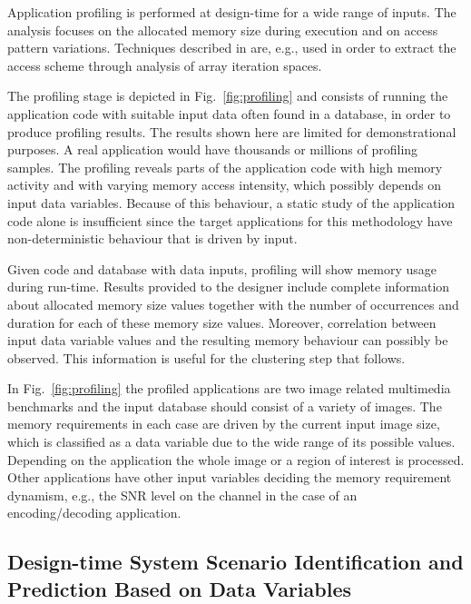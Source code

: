 \documentclass[a4paper,conference]{IEEEtran}
\begin{document}
Application profiling is performed at design-time for a wide range of inputs. The analysis focuses on the allocated memory size during execution and on access pattern variations. Techniques described in \cite{Ang13b} are, e.g., used in order to extract the access scheme through analysis of array iteration spaces.  

The profiling stage is depicted in Fig.~\ref{fig:profiling} and consists of running the application code with suitable input data often found in a database, in order to produce profiling results. The results shown here are limited for demonstrational purposes. A real application would have thousands or millions of profiling samples. The profiling reveals parts of the application code with high memory activity and with varying memory access intensity, which possibly depends on input data variables. Because of this behaviour, a static study of the application code alone is insufficient since the target applications for this methodology have non-deterministic behaviour that is driven by input.

Given code and database with data inputs, profiling will show memory usage during run-time.
Results provided to the designer include complete information about allocated memory size values together with the number of occurrences and duration for each of these memory size values. Moreover, correlation between input data variable values and the resulting memory behaviour can possibly be observed. This information is useful for the clustering step that follows. 

In Fig.~\ref{fig:profiling} the profiled applications are two image related multimedia benchmarks and the input database should consist of a variety of images. The memory requirements in each case are driven by the current input image size, which is classified as a data variable due to the wide range of its possible values. Depending on the application the whole image or a region of interest is processed. 
Other applications have other input variables deciding the memory requirement dynamism, e.g., the SNR level on the channel in the case of an encoding/decoding application.

\subsection{Design-time System Scenario Identification and Prediction Based on Data Variables}
\end{document}
